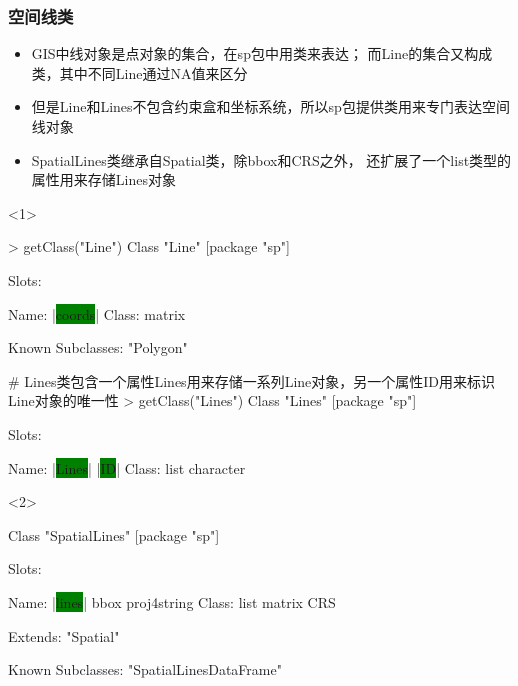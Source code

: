 \subsubsection{空间线类}
\begin{frame}[t,fragile]{\subsecname}{\subsubsecname}
\begin{itemize}
\item<1-> GIS中线对象是点对象的集合，在sp包中用类来表达；
而Line的集合又构成类，其中不同Line通过NA值来区分
\item<2-> 但是Line和Lines不包含约束盒和坐标系统，所以sp包提供类用来专门表达空间线对象
\item<2-> SpatialLines类继承自Spatial类，除bbox和CRS之外，
还扩展了一个list类型的属性用来存储Lines对象
\end{itemize}

\begin{overlayarea}{\textwidth}{\textheight}
\begin{onlyenv}<1>
\begin{rcode}
> getClass("Line")
Class "Line" [package "sp"]

Slots:
             
Name:  |\colorbox{green}{coords}|
Class: matrix

Known Subclasses: "Polygon"

# Lines类包含一个属性Lines用来存储一系列Line对象，另一个属性ID用来标识Line对象的唯一性
> getClass("Lines")
Class "Lines" [package "sp"]

Slots:
                          
Name:      |\colorbox{green}{Lines}|        |\colorbox{green}{ID}|
Class:      list character
\end{rcode}
\end{onlyenv}

\begin{onlyenv}<2>
\begin{rcode}
Class "SpatialLines" [package "sp"]

Slots:
                                          
Name:        |\colorbox{green}{lines}|        bbox proj4string
Class:        list      matrix         CRS

Extends: "Spatial"

Known Subclasses: "SpatialLinesDataFrame"
\end{rcode}
\end{onlyenv}


\end{overlayarea}
\end{frame}
